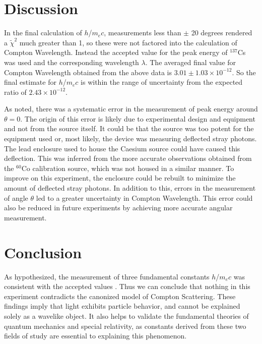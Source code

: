 \documentclass{article}
\begin{document}

\section{Discussion}

In the final calculation of $h$/$m_{e}c$, measurements less than $\pm$ 20 degrees rendered a $\widetilde\chi^{2}$ much greater than 1, so these were not factored into the calculation of Compton Wavelength. Instead the accepted value for the peak energy of $^{137}$Cs was used and the corresponding wavelength $\lambda$. The averaged final value for Compton Wavelength obtained from the above data is $3.01 \pm 1.03\times10^{-12}$. So the final estimate for $h$/$m_{e}c$ is within the range of uncertainty from the expected ratio of $2.43\times10^{-12}$. \cite{Constants} \\ \par

As noted, there was a systematic error in the measurement of peak energy around $\theta=0$. The origin of this error is likely due to experimental design and equipment and not from the source itself. It could be that the source was too potent for the equipment used or, most likely, the device was measuring deflected stray photons. The lead enclosure used to house the Caesium source could have caused this deflection. This was inferred from the more accurate observations obtained from the $^{60}$Co calibration source, which was not housed in a similar manner. To improve on this experiment, the enclosure could be rebuilt to minimize the amount of deflected stray photons. In addition to this, errors in the measurement of angle $\theta$ led to a greater uncertainty in Compton Wavelength. This error could also be reduced in future experiments by achieving more accurate angular measurement.

\section{Conclusion}

As hypothesized, the measurement of three fundamental constants $h$/$m_{e}c$ was consistent with the accepted values \cite{Constants}. Thus we can conclude that nothing in this experiment contradicts the canonized model of Compton Scattering. These findings imply that light exhibits particle behavior, and cannot be explained solely as a wavelike object. It also helps to validate the fundamental theories of quantum mechanics and special relativity, as constants derived from these two fields of study are essential to explaining this phenomenon.
\end{document}
